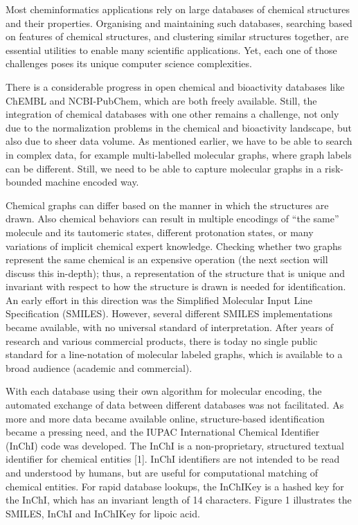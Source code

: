 \documentclass{sig-alternate}
\begin{document}
Most cheminformatics applications rely on large databases of chemical structures
and their properties. Organising and maintaining such databases, searching based
on features of chemical structures, and clustering similar structures together,
are essential utilities to enable many scientific applications. Yet, each one of
those challenges poses its unique computer science complexities.

There is a considerable progress in open chemical and bioactivity databases like
ChEMBL and NCBI-PubChem, which are both freely available. Still, the integration
of chemical databases with one other remains a challenge, not only due to the
normalization problems in the chemical and bioactivity landscape, but also due
to sheer data volume. As mentioned earlier, we have to be able to
search in complex data, for example multi-labelled molecular graphs, where
graph labels can be different. Still, we need to be able to capture
molecular graphs in a risk-bounded machine encoded way.

Chemical graphs can differ based on the manner in which the structures
are drawn. Also chemical behaviors can result in multiple encodings of
``the same'' molecule and its tautomeric states, different protonation
states, or many variations of implicit chemical expert
knowledge. Checking whether two graphs represent the same chemical is
an expensive operation (the next section will discuss this in-depth);
thus, a representation of the structure that is unique and invariant
with respect to how the structure is drawn is needed for
identification. An early effort in this direction was the Simplified
Molecular Input Line Specification (SMILES). However, several
different SMILES implementations became available, with no universal
standard of interpretation. After years of research and various
commercial products, there is today no single public standard for a
line-notation of molecular labeled graphs, which is available to a
broad audience (academic and
commercial). %

With each database using their own algorithm for molecular encoding,
the automated exchange of data between different databases was not
facilitated. As more and more data became available online,
structure-based identification became a pressing need, and the IUPAC
International Chemical Identifier (InChI) code was developed. The
InChI is a non-proprietary, structured textual identifier for chemical
entities [1]. InChI identifiers are not intended to be read and
understood by humans, but are useful for computational matching of
chemical entities. For rapid database lookups, the InChIKey is a
hashed key for the InChI, which has an invariant length of 14
characters. Figure 1 illustrates the SMILES, InChI and InChIKey for
lipoic acid.
\end{document}
